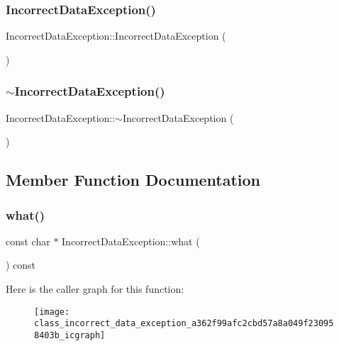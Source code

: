 \subsubsection{\texorpdfstring{IncorrectDataException()}{IncorrectDataException()}}
{\footnotesize\ttfamily Incorrect\+Data\+Exception\+::\+Incorrect\+Data\+Exception (\begin{DoxyParamCaption}{ }\end{DoxyParamCaption})}

\mbox{\label{class_incorrect_data_exception_a264ea44c51ba32e5ce1b5c04d365ffb7}} 
\subsubsection{\texorpdfstring{$\sim$IncorrectDataException()}{~IncorrectDataException()}}
{\footnotesize\ttfamily Incorrect\+Data\+Exception\+::$\sim$\+Incorrect\+Data\+Exception (\begin{DoxyParamCaption}{ }\end{DoxyParamCaption})}



\subsection{Member Function Documentation}
\mbox{\label{class_incorrect_data_exception_a362f99afc2cbd57a8a049f230958403b}} 
\subsubsection{\texorpdfstring{what()}{what()}}
{\footnotesize\ttfamily const char $\ast$ Incorrect\+Data\+Exception\+::what (\begin{DoxyParamCaption}{ }\end{DoxyParamCaption}) const\hspace{0.3cm}{\ttfamily [noexcept]}}

Here is the caller graph for this function\+:
\nopagebreak
\begin{figure}[H]
\begin{center}
\leavevmode
\texttt{[image: class\_incorrect\_data\_exception\_a362f99afc2cbd57a8a049f230958403b\_icgraph]}
\end{center}
\end{figure}


